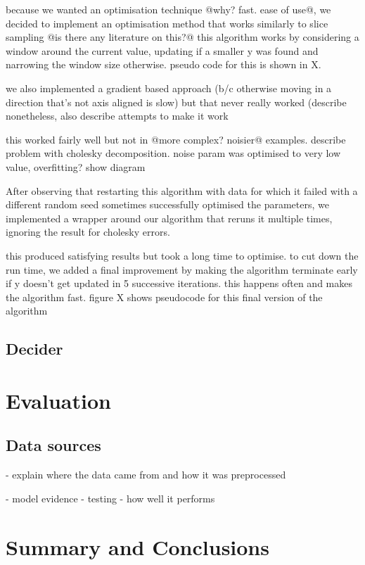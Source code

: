 \documentclass[a4paper,12pt,twoside,openright]{report}
\begin{document}
because we wanted an optimisation technique @why? fast. ease of use@, we decided to implement an optimisation method that works similarly to slice sampling @is there any literature on this?@ this algorithm works by considering a window around the current value, updating if a smaller y was found and narrowing the window size otherwise. pseudo code for this is shown in X.

we also implemented a gradient based approach (b/c otherwise moving in a direction that's not axis aligned is slow) but that never really worked (describe nonetheless, also describe attempts to make it work

this worked fairly well but not in @more complex? noisier@ examples. describe problem with cholesky decomposition. noise param was optimised to very low value, overfitting? show diagram

After observing that restarting this algorithm with data for which it failed with a different random seed sometimes successfully optimised the parameters, we implemented a wrapper around our algorithm that reruns it multiple times, ignoring the result for cholesky errors.

this produced satisfying results but took a long time to optimise. to cut down the run time, we added a final improvement by making the algorithm terminate early if y doesn't get updated in 5 successive iterations. this happens often and makes the algorithm fast. figure X shows pseudocode for this final version of the algorithm

\section{Decider} %



\chapter{Evaluation} 
\section{Data sources}
- explain where the data came from and how it was preprocessed


- model evidence
- testing
- how well it performs


\chapter{Summary and Conclusions} 





\appendix
\singlespacing

 
% 
\end{document}

